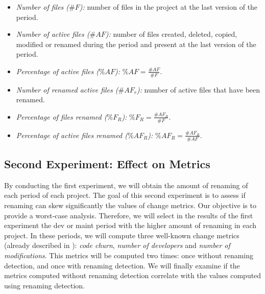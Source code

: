 \begin{itemize}
	\item \emph{Number of files ($\#F$):} number of files in the project at the last version of the period.
	\item \emph{Number of active files ($\#AF$):} number of files created, deleted, copied, modified or renamed during the period and present at the last version of the period.
	\item \emph{Percentage of active files ($\%AF$):} $\%AF = \frac{\#AF}{\#F}$.
	\item \emph{Number of renamed active files ($\#AF_{r}$):} number of active files that have been renamed.
	\item \emph{Percentage of files renamed ($\%F_{R}$):} $\%F_{R} = \frac{\#AF_{R}}{\#F}$.
	\item \emph{Percentage of active files renamed ($\%AF_{R}$):} $\%AF_{R} = \frac{\#AF_{R}}{\#AF}$.
\end{itemize}

\subsection{Second Experiment: Effect on Metrics}

By conducting the first experiment, we will obtain the amount of renaming of each period of each project. The goal of this second experiment is to assess if renaming can skew significantly the values of change metrics. Our objective is to provide a worst-case analysis. Therefore, we will select in the results of the first experiment the dev or maint period with the higher amount of renaming in each project. In these periods, we will compute three well-known change metrics (already described in ): \emph{code churn}, \emph{number of developers} and \emph{number of modifications}. This metrics will be computed two times: once without renaming detection, and once with renaming detection. We will finally examine if the metrics computed without renaming detection correlate with the values computed using renaming detection.
